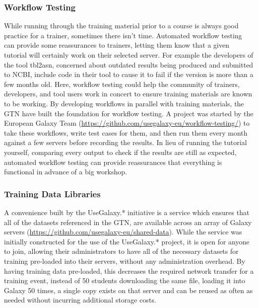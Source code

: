 \documentclass[10pt,letterpaper]{article}
\begin{document}
\subsubsection*{Workflow Testing}
While running through the training material prior to a course is always good practice for a trainer, sometimes there isn't time.
Automated workflow testing can provide some reassurances to trainers, letting them know that a given tutorial will certainly work on their selected server.
For example the developers of the tool tbl2asn, concerned about outdated results being produced and submitted to NCBI, include code in their tool to cause it to fail if the version is more than a few months old.
Here, workflow testing could help the community of trainers, developers, and tool users work in concert to ensure training materials are known to be working.
By developing workflows in parallel with training materials, the GTN have built the foundation for workflow testing. A project was started by the European Galaxy Team (\url{https://github.com/usegalaxy-eu/workflow-testing/}) to take these workflows, write test cases for them, and then run them every month against a few servers before recording the results.
In lieu of running the tutorial yourself, comparing every output to check if the results are still as expected, automated workflow testing can provide reassurances that everything is functional in advance of a big workshop.

\subsubsection*{Training Data Libraries}
A convenience built by the UseGalaxy.* initiative is a service which ensures that all of the datasets referenced in the GTN, are available across an array of Galaxy servers (\url{https://github.com/usegalaxy-eu/shared-data}).
While the service was initially constructed for the use of the UseGalaxy.* project, it is open for anyone to join, allowing their administrators to have all of the necessary datasets for training pre-loaded into their servers, without any administration overhead.
By having training data pre-loaded, this decreases the required network transfer for a training event, instead of 50 students downloading the same file, loading it into Galaxy 50 times, a single copy exists on that server and can be reused as often as needed without incurring additional storage costs.
\end{document}
